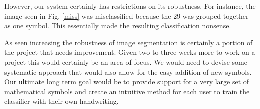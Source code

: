 
However, our system certainly has restrictions on its robustness. For instance, the image seen in Fig. \ref{miss} was misclassified because the 29 was grouped together as one symbol. This essentially made the resulting classification nonsense.  

As seen increasing the robustness of image segmentation is certainly a portion of the project that needs improvement. Given two to three weeks more to work on a project this would certainly be an area of focus. We would need to devise some systematic approach that would also allow for the easy addition of new symbols. Our ultimate long term goal would be to provide support for a very large set of mathematical symbols and create an intuitive method for each user to train the classifier with their own handwriting.